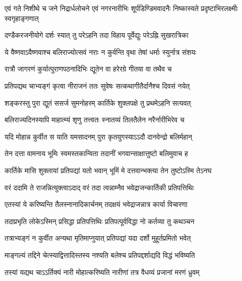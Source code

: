 \threelineshloka
{एवं गते निशीथे च जने निद्रार्धलोचने}
{एवं नगरनारीभिः शूर्पडिण्डिमवादनैः}
{निष्कास्यते प्रदृष्टाभिरलक्ष्मीः स्वगृहाङ्गणात्} %

\twolineshloka
{दण्डैकरजनीयोगे दर्शः स्यात् तु परेऽहनि}
{तदा विहाय पूर्वेद्युः परेऽह्नि सुखरात्रिका} %

\twolineshloka
{ये वैष्णवाऽवैष्णवाश्च बलिराज्योत्सवं नराः}
{न कुर्वन्ति वृथा तेषां धर्माः स्युर्नात्र संशयः} %

\twolineshloka
{रात्रौ जागरणं कुर्यात्पुराणपठनादिभिः}
{द्यूतेन वा हरेरग्रे गीतया वा तथैव च} %





\twolineshloka
{प्रतिपद्यथ चाभ्यङ्गं कृत्वा नीराजनं ततः}
{सुवेषः सत्कथागीतैर्दानैश्च दिवसं नयेत्} %

\twolineshloka
{शङ्करस्तु पुरा द्यूतं ससर्ज सुमनोहरम्}
{कार्तिके शुक्लपक्षे तु प्रथमेऽहनि सत्यवत्} %

\twolineshloka
{बलिराज्यदिनस्यापि माहात्म्यं शृणु तत्त्वतः}
{स्नातव्यं तिलतैलेन नरैर्नारीभिरेव च} %

\twolineshloka
{यदि मोहान्न कुर्वीत स याति यमसादनम्}
{पुरा कृतयुगस्याऽऽदौ दानवेन्द्रो बलिर्महान्} %

\twolineshloka
{तेन दत्ता वामनाय भूमिः स्वमस्तकान्विता}
{तदानीं भगवान्साक्षात्तुष्टो बलिमुवाच ह} %

\twolineshloka
{कार्तिके मासि शुक्लायां प्रतिपद्यां यतो भवान्}
{भूमिं मे दत्तवान्भक्त्या तेन तुष्टोऽस्मि तेऽनघ} %

\twolineshloka
{वरं ददामि ते राजन्नित्युक्त्वाऽदाद् वरं तदा}
{त्वन्नाम्नैव भवेद्राजन्कार्तिकी प्रतिपत्तिथिः} %

\twolineshloka
{एतस्यां ये करिष्यन्ति तैलस्नानादिकार्चनम्}
{तदक्षयं भवेद्राजन्नात्र कार्या विचारणा} %

\twolineshloka
{तदाप्रभृति लोकेऽस्मिन् प्रसिद्धा प्रतिपत्तिथिः}
{प्रतिपत्पूर्वविद्धा नो कर्तव्या तु कथञ्चन} %

\twolineshloka
{तत्राभ्यङ्गं न कुर्वीत अन्यथा मृतिमाप्नुयात्}
{प्रतिपद्यां यदा दर्शो मुहूर्तप्रमितो भवेत्} %

\twolineshloka
{माङ्गल्यं तद्दिने चेत्स्याद्वित्तादिस्तस्य नश्यति}
{बलेश्च प्रतिपद्दर्शाद्यदि विद्धं भविष्यति} %

\twolineshloka
{तस्यां यद्यथ चाऽऽर्तिक्यं नारी मोहात्करिष्यति}
{नारीणां तत्र वैधव्यं प्रजानां मरणं ध्रुवम्} %

